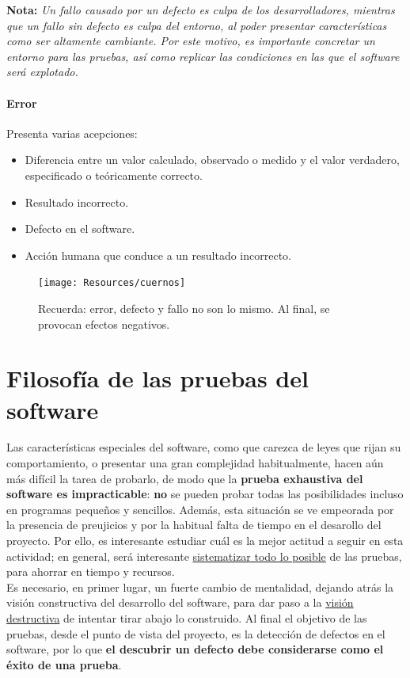 \textbf{Nota:} \textit{Un fallo causado por un defecto es culpa de los desarrolladores, mientras que un fallo sin defecto es culpa del entorno, al poder presentar características como ser altamente cambiante. Por este motivo, es importante concretar un entorno para las pruebas, así como replicar las condiciones en las que el software será explotado.}

\paragraph{Error} Presenta varias acepciones:
\begin{itemize}
    \item Diferencia entre un valor calculado, observado o medido y el valor verdadero, especificado o teóricamente correcto.
    \item Resultado incorrecto.
    \item Defecto en el software.
    \item Acción humana que conduce a un resultado incorrecto.
\end{itemize}

\begin{figure}[H]
    \centering
    \texttt{[image: Resources/cuernos]}
    \caption{Recuerda: error, defecto y fallo no son lo mismo. Al final, se provocan efectos negativos.}
    \label{fig:cuernos}
\end{figure}


\section{Filosofía de las pruebas del software}

Las características especiales del software, como que carezca de leyes que rijan su comportamiento, o presentar una gran complejidad habitualmente, hacen aún más difícil la tarea de probarlo, de modo que la \textbf{prueba exhaustiva del software es impracticable}: \textbf{no} se pueden probar todas las posibilidades incluso en programas pequeños y sencillos. Además, esta situación se ve empeorada por la presencia de preujicios y por la habitual falta de tiempo en el desarollo del proyecto. Por ello, es interesante estudiar cuál es la mejor actitud a seguir en esta actividad; en general, será interesante \uline{sistematizar todo lo posible} de las pruebas, para ahorrar en tiempo y recursos.\\

Es necesario, en primer lugar, un fuerte cambio de mentalidad, dejando atrás la visión constructiva del desarrollo del software, para dar paso a la \uline{visión destructiva} de intentar tirar abajo lo construido. Al final el objetivo de las pruebas, desde el punto de vista del proyecto, es la detección de defectos en el software, por lo que \textbf{el descubrir un defecto debe considerarse como el éxito de una prueba}.\\

